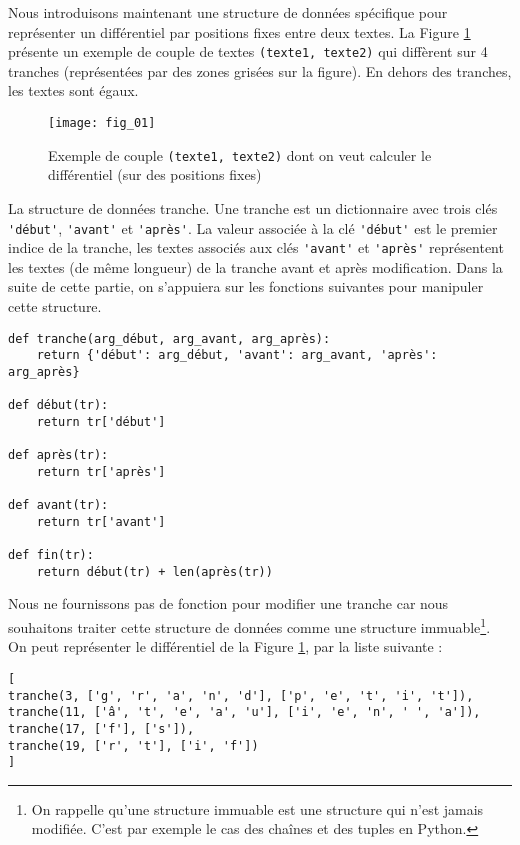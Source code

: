 Nous introduisons maintenant une structure de données spécifique pour représenter un différentiel par positions fixes entre deux textes.
La Figure \ref{fig:01} présente un exemple de couple de textes \lstinline{(texte1, texte2)} qui diffèrent sur 4
tranches (représentées par des zones grisées sur la figure). En dehors des tranches, les textes sont
égaux.

\begin{figure}[H]
\centering
\texttt{[image: fig\_01]}
\caption{Exemple de couple \lstinline{(texte1, texte2)} dont on veut calculer le différentiel (sur des
positions fixes) \label{fig:01}}
\end{figure}

\begin{defi}{La structure de données tranche.} Une tranche est un dictionnaire avec trois clés \lstinline{'début'},
\lstinline{'avant'} et \lstinline{'après'}. La valeur associée à la clé \lstinline{'début'} est le premier indice de la tranche, les textes associés aux clés \lstinline{'avant'} et \lstinline{'après'} représentent les textes (de même longueur) de la tranche avant et après modification. Dans la suite de cette partie, on s'appuiera sur les fonctions
suivantes pour manipuler cette structure.
\end{defi}

\begin{lstlisting}
def tranche(arg_début, arg_avant, arg_après):
    return {'début': arg_début, 'avant': arg_avant, 'après': arg_après}

def début(tr):
    return tr['début']

def après(tr):
    return tr['après']

def avant(tr):
    return tr['avant']

def fin(tr):
    return début(tr) + len(après(tr))
\end{lstlisting}

Nous ne fournissons pas de fonction pour modifier une tranche car nous souhaitons traiter
cette structure de données comme une structure immuable\footnote{On rappelle qu'une structure immuable est une structure qui n'est jamais modifiée. C'est par exemple le
cas des chaînes et des tuples en Python.}.
On peut représenter le différentiel de la Figure \ref{fig:01}, par la liste suivante :

\begin{lstlisting}
[
tranche(3, ['g', 'r', 'a', 'n', 'd'], ['p', 'e', 't', 'i', 't']),
tranche(11, ['â', 't', 'e', 'a', 'u'], ['i', 'e', 'n', ' ', 'a']),
tranche(17, ['f'], ['s']),
tranche(19, ['r', 't'], ['i', 'f'])
]
\end{lstlisting}

